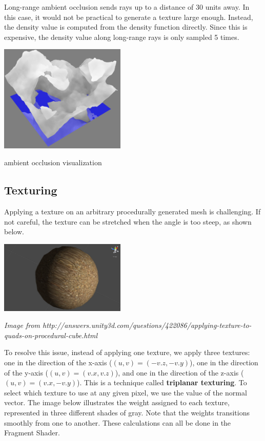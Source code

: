 \documentclass {article}
\begin{document}
Long-range ambient occlusion sends rays up to a distance of 30 units away. In this case, it would not be practical to generate a texture large enough. Instead, the density value is computed from the density function directly. Since this is expensive, the density value along long-range rays is only sampled 5 times.

\begin{center}
    \includegraphics[width=6cm]{ambientocclusion.png}

    ambient occlusion visualization
\end{center}

\subsection{Texturing}

Applying a texture on an arbitrary procedurally generated mesh is challenging. If not careful, the texture can be stretched when the angle is too steep, as shown below.

\begin{center}
    \includegraphics[width=6cm]{planetoid.jpg}

    \textit{Image from http://answers.unity3d.com/questions/422086/applying-texture-to-quads-on-procedural-cube.html}
\end{center}

To resolve this issue, instead of applying one texture, we apply three textures: one in the direction of the x-axis ($(u,v) = (-v.z, -v.y)$), one in the direction of the y-axis ($(u, v) = (v.x, v.z)$), and one in the direction of the z-axis ($(u, v) = (v.x, -v.y)$). This is a technique called \textbf{triplanar texturing}. To select which texture to use at any given pixel, we use the value of the normal vector. The image below illustrates the weight assigned to each texture, represented in three different shades of gray. Note that the weights transitions smoothly from one to another. These calculations can all be done in the Fragment Shader.
\end{document}
